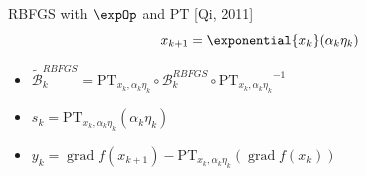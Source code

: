 \documentclass[9pt]{beamer}
\begin{document}

\begin{frame}{RBFGS with $\expOp$ and $\mathrm{PT}$}
    \vspace{-1\baselineskip}\hfill{\tiny{[Qi, 2011]}}
    \begin{equation*}
        x_{k+1} = \exponential{x_k}(\alpha_k \eta_k)
    \end{equation*}
    \begin{itemize}
        \item $\widetilde{\mathcal{B}}^{RBFGS}_k = \mathrm{PT}_{x_k, \alpha_k \eta_k} \circ \mathcal{B}^{RBFGS}_k \circ {\mathrm{PT}_{x_k, \alpha_k \eta_k}}^{-1}$
        \item $s_k = \mathrm{PT}_{x_k, \alpha_k \eta_k}(\alpha_k \eta_k)$
        \item $y_k = \operatorname{grad} f(x_{k+1}) - \mathrm{PT}_{x_k, \alpha_k \eta_k}(\operatorname{grad} f(x_k))$
    \end{itemize}
\end{frame}
\end{document}
